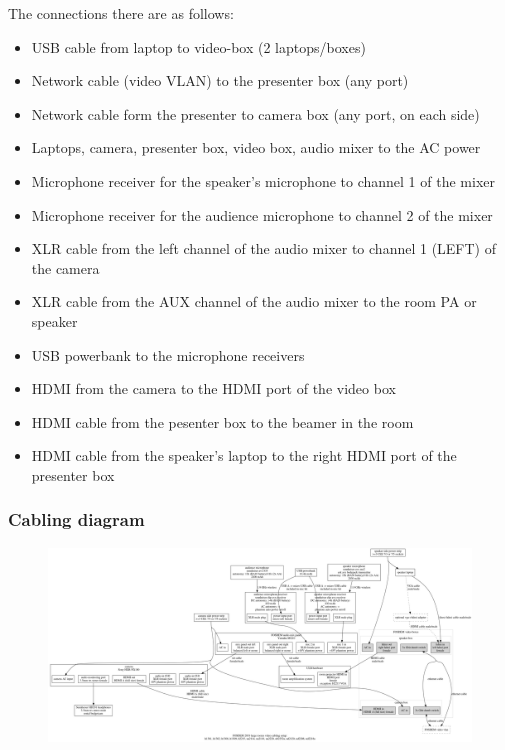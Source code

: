 \documentclass{article}
\begin{document}
The connections there are as follows:

\begin{itemize}
  \item USB cable from laptop to video-box (2 laptops/boxes)
  \item Network cable (video VLAN) to the presenter box (any port)
  \item Network cable form the presenter to camera box (any port, on each side)
  \item Laptops, camera, presenter box, video box, audio mixer to the AC power
  \item Microphone receiver for the speaker's microphone to channel 1 of the mixer
  \item Microphone receiver for the audience microphone to channel 2 of the mixer
  \item XLR cable from the left channel of the audio mixer to channel 1 (LEFT) of the camera
  \item XLR cable from the AUX channel of the audio mixer to the room PA or speaker
  \item USB powerbank to the microphone receivers
  \item HDMI from the camera to the HDMI port of the video box
  \item HDMI cable from the pesenter box to the beamer in the room
  \item HDMI cable from the speaker's laptop to the right HDMI port of the presenter box
\end{itemize}
\subsubsection{Cabling diagram}
\begin{figure}[H]
  \begin{sideways}
  \centering
  \includegraphics[width = 200mm]{../../graph/cabling_large_rooms.png}
  \end{sideways}
\end{figure}
\end{document}
